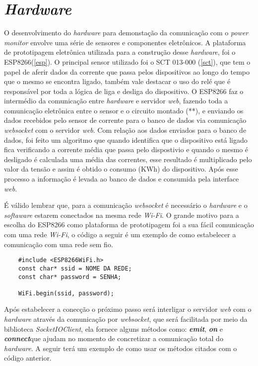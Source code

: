 \section[\textit{Hardware}]{\textit{Hardware}}\label{hard-sec}
O desenvolvimento do \textit{hardware} para demonstação da comunicação com o \textit{power monitor} envolve uma série de sensores e componentes
eletrônicos. A plataforma de prototipagem eletrônica utilizada para a construção desse \textit{hardware}, foi o ESP8266(\autoref{esp}). O principal sensor
utilizado foi o SCT 013-000 (\autoref{sct}), que tem o papel de aferir dados da corrente que passa pelos dispositivos ao longo do tempo que o mesmo se encontra
ligado, também vale destacar o uso do relé que é responsável por toda a lógica de liga e desliga do dispositivo. O ESP8266 faz o intermédio da comunicação entre 
\textit{hardware} e servidor \textit{web}, fazendo toda a comunicação eletrônica entre o sensor e o circuito montado (**), e enviando os dados
recebidos pelo sensor de corrente para o banco de dados via comunicação \textit{websocket} com o servidor \textit{web}. Com relação aos dados enviados 
para o banco de dados, foi feito um algoritmo que quando identifica que o dispositivo está ligado fica verificando a corrente média que 
passa pelo dispostivio e quando o mesmo é desligado é calculada uma média das correntes, esse resultado é multiplicado pelo valor da tensão
e assim é obtido o consumo (KWh) do dispositivo. Após esse processo a informação é levada ao banco de dados e consumida pela interface \textit{web}.

É válido lembrar que, para a comunicação \textit{websocket} é necessário o \textit{hardware} e o \textit{softaware} estarem conectados
na mesma rede \textit{Wi-Fi}. O grande motivo para a escolha do ESP8266 como plataforma de prototipagem foi a sua fácil comunicação com uma rede
\textit{Wi-Fi}, o código a seguir é um exemplo de como estabelecer a comunicação com uma rede sem fio.

\newpage

\begin{lstlisting}
	#include <ESP8266WiFi.h>
	const char* ssid = NOME DA REDE;
	const char* password = SENHA;
	
	WiFi.begin(ssid, password);
\end{lstlisting}

Após estabelecer a conecção o próximo passo será interligar o servidor \textit{web} com o \textit{hardware} através da comunicação por \textit{websocket},
que será facilitada por meio da biblioteca \textit{SocketIOClient}, ela fornece alguns métodos como: \textit{\textbf{emit}}\protect\footnotemark, \textit{\textbf{on}}\protect\footnotemark 
e \textit{\textbf{connect}}\protect\footnotemark  que ajudam no momento de concretizar a comunicação total do \textit{hardware}. A seguir terá um
exemplo de como usar os métodos citados com o código anterior.

